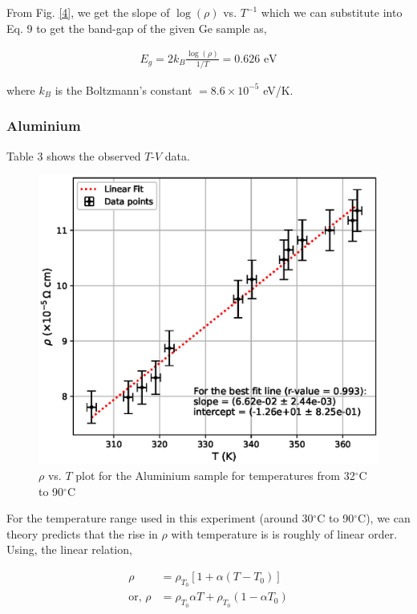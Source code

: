 From Fig. \ref{4}, we get the slope of $\log(\rho)$ vs. $T^{-1}$ which we can substitute into Eq. 9 to get the band-gap of the given Ge sample as,

\begin{align*}
    E_g = 2k_B\frac{\log(\rho)}{1/T} = 0.626 \text{ eV}
\end{align*}

\noindent where $k_B$ is the Boltzmann’s constant $= 8.6\times 10^{-5}$ eV/K.
\subsubsection{Aluminium}
Table 3 shows the observed $T$-$V$ data.

\begin{figure}[H]   
    \centering
    \includegraphics[width=1\columnwidth]{images/temp-al.eps}
    \caption{$\rho$ vs. $T$ plot for the Aluminium sample for temperatures from 32$^\circ$C to 90$^\circ$C}
    \label{5}
\end{figure}
For the temperature range used in this experiment (around 30$^\circ$C to 90$^\circ$C), we can theory predicts that the rise in $\rho$ with temperature is is roughly of linear order. Using, the linear relation,

\begin{align}
    \rho &= \rho_{T_0}[1+\alpha (T-T_0)]\\
    \text{or, }\rho &= \rho_{T_0} \alpha T + \rho_{T_0}(1-\alpha T_0) \nonumber 
\end{align}

